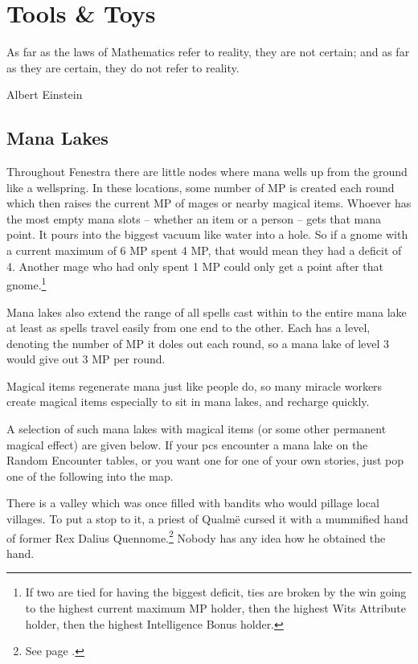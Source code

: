 \chapter{Tools \& Toys}

\epigraph{As far as the laws of Mathematics refer to reality, they are not certain; and as far as they are certain, they do not refer to reality.}{Albert Einstein}

\section{Mana Lakes}\label{mana_lake}

\begin{multicols}{2}

\noindent
Throughout Fenestra there are little nodes where mana wells up from the ground like a wellspring.
In these locations, some number of MP is created each round which then raises the current MP of mages or nearby magical items.
Whoever has the most empty mana slots -- whether an item or a person -- gets that mana point.
It pours into the biggest vacuum like water into a hole.
So if a gnome with a current maximum of 6 MP spent 4 MP, that would mean they had a deficit of 4.
Another mage who had only spent 1 MP could only get a point after that gnome.\footnote{If two are tied for having the biggest deficit, ties are broken by the win going to the highest current maximum MP holder, then the highest Wits Attribute holder, then the highest Intelligence Bonus holder.}

Mana lakes also extend the range of all spells cast within to the entire mana lake at least as spells travel easily from one end to the other.  Each has a level, denoting the number of MP it doles out each round, so a mana lake of level 3 would give out 3 MP per round.

Magical items regenerate mana just like people do, so many miracle workers create magical items especially to sit in mana lakes, and recharge quickly.

A selection of such mana lakes with magical items (or some other permanent magical effect) are given below.
If your \glspl{pc} encounter a mana lake on the Random Encounter tables, or you want one for one of your own stories, just pop one of the following into the map.


There is a valley which was once filled with bandits who would pillage local villages.
To put a stop to it, a priest of Qualm\"{e} cursed it with a mummified hand of former Rex Dalius Quennome.\footnote{See page \pageref{h_dalius}.}
Nobody has any idea how he obtained the hand.


\end{multicols}
